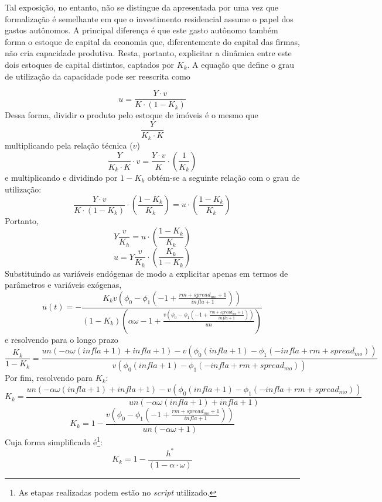 
Tal exposição, no entanto, não se distingue da apresentada por \textcite{freitas_growth_2015} uma vez que formalização é semelhante em que o investimento residencial assume o papel dos gastos autônomos. A principal diferença é que este gasto autônomo também forma o estoque de capital da economia que, diferentemente do capital das firmas, não cria capacidade produtiva. Resta, portanto, explicitar a dinâmica entre este dois estoques de capital distintos, captados por $K_k$. A equação que define o grau de utilização da capacidade pode ser reescrita como

$$
u = \frac{Y\cdot v}{K \cdot (1-K_k)}
$$
Dessa forma, dividir o produto pelo estoque de imóveis é o mesmo que
$$
\frac{Y}{K_k\cdot K}
$$
multiplicando pela relação técnica ($v$)
$$
\frac{Y}{K_k\cdot K}\cdot v = \frac{Y\cdot v}{K}\cdot \left(\frac{1}{K_k}\right)
$$
e multiplicando e dividindo por $1-K_k$ obtém-se a seguinte relação com o grau de utilização:
$$
\frac{Y\cdot v}{K\cdot (1-K_k)}\cdot \left(\frac{1-K_k}{K_k}\right) = u \cdot \left(\frac{1-K_k}{K_k}\right)
$$
Portanto,
$$
Y\frac{v}{K_h} =  u \cdot \left(\frac{1-K_k}{K_k}\right)
$$
$$
u = Y\frac{v}{K_h} \cdot \left(\frac{K_k}{1-K_k}\right)
$$
Substituindo as variáveis endógenas de modo a explicitar apenas em termos de parâmetros e variáveis exógenas,
$$
u{\left(t \right)} = - \frac{K_{k} v \left(\phi_{0} - \phi_{1} \left(-1 + \frac{rm + spread_{mo} + 1}{infla + 1}\right)\right)}{\left(1 - K_{k}\right) \left(\alpha \omega - 1 + \frac{v \left(\phi_{0} - \phi_{1} \left(-1 + \frac{rm + spread_{mo} + 1}{infla + 1}\right)\right)}{un}\right)}
$$
e resolvendo para o longo prazo
$$
\frac{K_{k}}{1 - K_{k}} = \frac{un \left(- \alpha \omega \left(infla + 1\right) + infla + 1\right) - v \left(\phi_{0} \left(infla + 1\right) - \phi_{1} \left(- infla + rm + spread_{mo}\right)\right)}{v \left(\phi_{0} \left(infla + 1\right) - \phi_{1} \left(- infla + rm + spread_{mo}\right)\right)}
$$
Por fim, resolvendo para $K_k$:
$$
K_{k} = \frac{un \left(- \alpha \omega \left(infla + 1\right) + infla + 1\right) - v \left(\phi_{0} \left(infla + 1\right) - \phi_{1} \left(- infla + rm + spread_{mo}\right)\right)}{un \left(- \alpha \omega \left(infla + 1\right) + infla + 1\right)}
$$
\begin{equation}
\label{kAnali}
K_{k} = 1 - \frac{v \left(\phi_{0} - \phi_{1} \left(-1 + \frac{rm + spread_{mo} + 1}{infla + 1}\right)\right)}{un \left(- \alpha \omega + 1\right)}
\end{equation}
Cuja forma simplificada é\footnote{As etapas realizadas podem estão no \textit{script} utilizado.}:
$$
K_k = 1 - \frac{h^*}{(1 - \alpha\cdot\omega)}
$$

